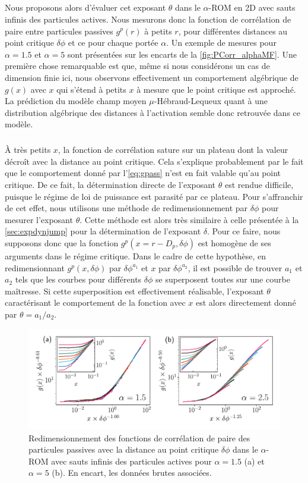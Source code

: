 \subparagraph{}Nous proposons alors d'évaluer cet exposant $\theta$ dans le $\alpha$-ROM en 2D avec sauts infinis des particules actives. Nous mesurons donc la fonction de corrélation de paire entre particules passives $g^p(r)$ à petits $r$, pour différentes distances au point critique $\delta\phi$ et ce pour chaque portée $\alpha$. Un exemple de mesures pour $\alpha = 1.5$ et $\alpha = 5$ sont présentées sur les encarts de la \autoref{fig:PCorr_alphaMF}. Une première chose remarquable est que, même si nous considérons un cas de dimension finie ici, nous observons effectivement un comportement algébrique de $g(x)$ avec $x$ qui s'étend à petits $x$ à mesure que le point critique est approché. La prédiction du modèle champ moyen $\mu$-Hébraud-Lequeux quant à une distribution algébrique des distances à l'activation semble donc retrouvée dans ce modèle.

\subparagraph{}\`A très petits $x$, la fonction de corrélation sature sur un plateau dont la valeur décroît avec la distance au point critique. Cela s'explique probablement par le fait que le comportement donné par l'\autoref{eq:gpass} n'est en fait valable qu'au point critique. De ce fait, la détermination directe de l'exposant $\theta$ est rendue difficile, puisque le régime de loi de puissance est parasité par ce plateau. Pour s'affranchir de cet effet, nous utilisons une méthode de redimensionnement par $\delta\phi$ pour mesurer l'exposant $\theta$. Cette méthode est alors très similaire à celle présentée à la \autoref{sec:expdynjump} pour la détermination de l'exposant $\delta$. Pour ce faire, nous supposons donc que la fonction $g^p(x=r-D_p, \delta\phi)$ est homogène de ses arguments dans le régime critique. Dans le cadre de cette hypothèse, en redimensionnant $g^p(x, \delta\phi)$ par $\delta\phi^{a_1}$ et $x$ par $\delta\phi^{a_2}$, il est possible de trouver $a_1$ et $a_2$ tels que les courbes pour différents $\delta\phi$ se superposent toutes sur une courbe maîtresse. Si cette superposition est effectivement réalisable, l'exposant $\theta$ caractérisant le comportement de la fonction avec $x$ est alors directement donné par $\theta = a_1/a_2$.

\begin{figure}[h]
	\centering
	\includegraphics[width=\textwidth]{Chapitre3/Figures/Interpretation/PCorr_alphaMF.pdf}
	\caption{Redimensionnement des fonctions de corrélation de paire des particules passives avec la distance au point critique $\delta\phi$ dans le $\alpha$-ROM avec sauts infinis des particules actives pour $\alpha = 1.5$ (a) et $\alpha=5$ (b). En encart, les données brutes associées. }
	\label{fig:PCorr_alphaMF}
\end{figure}

